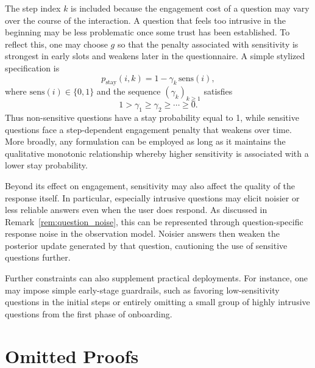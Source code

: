 \documentclass{article}
\begin{document}
The step index $k$ is included because the engagement cost of a question may vary over the course of the interaction. A question that feels too intrusive in the beginning may
be less problematic once some trust has been established. To reflect this, one may choose $g$
so that the penalty associated with sensitivity is strongest in early slots and weakens later in the
questionnaire. A simple stylized specification is
\[
p_{\mathrm{stay}}(i,k)=1-\gamma_k\,\mathrm{sens}(i),
\]
where $\mathrm{sens}(i)\in\{0,1\}$ and the sequence $(\gamma_k)_{k\ge 1}$ satisfies
\[
1>\gamma_1\ge \gamma_2\ge \cdots \ge 0.
\]
Thus non-sensitive questions have a stay probability equal to 1, while sensitive questions face a step-dependent engagement penalty that weakens over time. More broadly, any formulation can be employed as long as it maintains the qualitative monotonic
relationship whereby higher sensitivity is associated with a lower stay probability.


Beyond its effect on engagement, sensitivity may also affect the
quality of the response itself. In particular, especially intrusive questions may elicit noisier or less
reliable answers even when the user does respond. As discussed in Remark~\ref{rem:question_noise},
this can be represented through question-specific response noise in the observation model. Noisier answers then weaken
the posterior update generated by that question, cautioning the use of sensitive questions further.

Further constraints can also supplement practical deployments. For instance, one may impose simple early-stage guardrails, such as favoring low-sensitivity
questions in the initial steps or entirely omitting a small group of highly intrusive questions from the
 first phase of onboarding.

\newpage

\printbibliography

\newpage
\appendix
{}
\chapter{Omitted Proofs}
\end{document}
